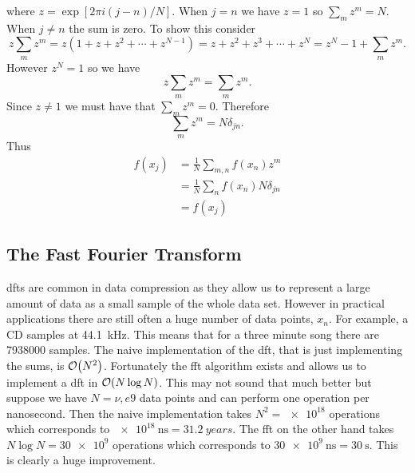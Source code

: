 \documentclass[a4paper]{article}
\begin{document}
    where \(z = \exp[2\pi i(j - n)/N]\).
    When \(j = n\) we have \(z = 1\) so \(\sum_m z^m = N\).
    When \(j \ne n\) the sum is zero.
    To show this consider
    \[z\sum_{m} z^m = z(1 + z + z^2 + \dotsb + z^{N-1}) = z + z^2 + z^3 + \dotsb + z^{N} = z^N - 1 + \sum_m z^m.\]
    However \(z^N = 1\) so we have
    \[z\sum_{m} z^m = \sum_{m} z^m.\]
    Since \(z \ne 1\) we must have that \(\sum_mz^m = 0\).
    Therefore
    \[\sum_m z^m = N\delta_{jn}.\]
    Thus
    \begin{align*}
        f(x_j) &= \frac{1}{N}\sum_{m, n} f(x_n)z^m\\
        &= \frac{1}{N}\sum_n f(x_n)N\delta_{jn}\\
        &= f(x_j)
    \end{align*}
    
    \subsection{The Fast Fourier Transform}
    \glspl{dft} are common in data compression as they allow us to represent a large amount of data as a small sample of the whole data set.
    However in practical applications there are still often a huge number of data points, \(x_n\).
    For example, a CD samples at \SI{44.1}{\kilo\hertz}.
    This means that for a three minute song there are 7938000 samples.
    The naive implementation of the \gls{dft}, that is just implementing the sums, is \(\order{N^2}\).
    Fortunately the \gls{fft} algorithm exists and allows us to implement a \gls{dft} in \(\order{N\log N}\).
    This may not sound that much better but suppose we have \(N = \nu,
    e9\) data points and can perform one operation per nanosecond.
    Then the naive implementation takes \(N^2 = \num{e18}\) operations which corresponds to \(\SI{e18}{\nano\second} = \SI{31.2}{years}\).
    The \gls{fft} on the other hand takes \(N\log N = \num{30e9}\) operations which corresponds to \(\SI{30e9}{\nano\second} = \SI{30}{\second}\).
    This is clearly a huge improvement.
    
\end{document}
